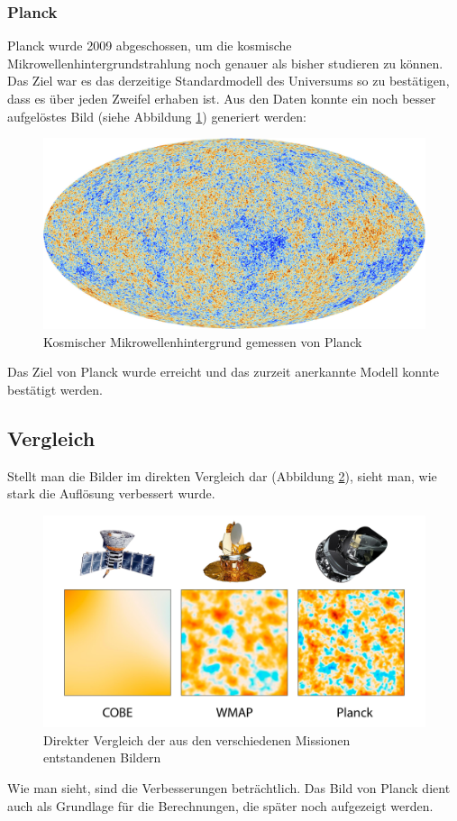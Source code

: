 \subsubsection{Planck}
Planck wurde 2009 abgeschossen, um die kosmische 
Mikrowellenhintergrundstrahlung noch genauer als bisher studieren zu können.
Das Ziel war es das derzeitige Standardmodell des Universums so zu bestätigen, 
dass es über jeden Zweifel erhaben ist.
Aus den Daten konnte ein noch besser aufgelöstes Bild (siehe Abbildung \ref{fig:CMB_Planck}) generiert werden:
\begin{figure}
	\includegraphics[width=\linewidth]{cmb/images/CMB_Planck.jpg}
	\caption{Kosmischer Mikrowellenhintergrund gemessen von Planck}
	\label{fig:CMB_Planck}
\end{figure}
Das Ziel von Planck wurde erreicht und das zurzeit anerkannte Modell konnte 
bestätigt werden.

\subsection{Vergleich}
Stellt man die Bilder im direkten Vergleich dar (Abbildung 
\ref{fig:COBE_WMAP_PLANCK}), sieht man, wie stark die Auflösung verbessert 
wurde.
\begin{figure}
	\includegraphics[width=\linewidth]{cmb/images/COBE_WMAP_Planck.jpg}
	\caption{Direkter Vergleich der aus den verschiedenen Missionen 
	entstandenen Bildern}
	\label{fig:COBE_WMAP_PLANCK}
\end{figure}
Wie man sieht, sind die Verbesserungen beträchtlich.
Das Bild von Planck dient auch als Grundlage für die Berechnungen, die später 
noch aufgezeigt werden.
